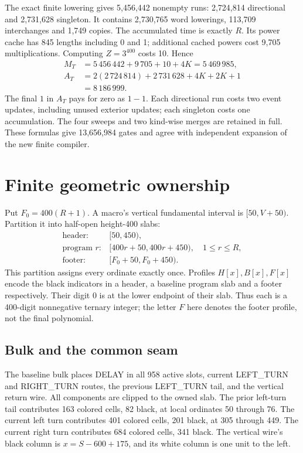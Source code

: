 \documentclass[11pt,letterpaper]{article}
\theoremstyle{definition}\newtheorem{definition}[theorem]{Definition}
\theoremstyle{remark}\newtheorem{remark}[theorem]{Remark}
\begin{document}
The exact finite lowering gives 5,456,442 nonempty runs: 2,724,814 directional and 2,731,628 singleton. It contains 2,730,765 word lowerings, 113,709 interchanges and 1,749 copies. The accumulated time is exactly $R$. Its power cache has 845 lengths including 0 and 1; additional cached powers cost 9,705 multiplications. Computing $Z=3^{400}$ costs 10. Hence
\begin{align*}
 M_T&=5\,456\,442+9\,705+10+4K=5\,469\,985,\\
 A_T&=2(2\,724\,814)+2\,731\,628+4K+2K+1\\
    &=8\,186\,999.
\end{align*}
The final $1$ in $A_T$ pays for zero as $1-1$. Each directional run costs two event updates, including unused exterior updates; each singleton costs one accumulation. The four sweeps and two kind-wise merges are retained in full. These formulas give 13,656,984 gates and agree with independent expansion of the new finite compiler.

\section{Finite geometric ownership}\label{ptr:sc:sec:geometry}
Put $F_0=400(R+1)$. A macro's vertical fundamental interval is $[50,V+50)$. Partition it into half-open height-400 slabs:
\begin{align*}
 \text{header: } &[50,450),\\
 \text{program }r: &[400r+50,400r+450),\quad 1\le r\le R,\\
 \text{footer: } &[F_0+50,F_0+450).
\end{align*}
This partition assigns every ordinate exactly once. Profiles $H[x],B[x],F[x]$ encode the black indicators in a header, a baseline program slab and a footer respectively. Their digit 0 is at the lower endpoint of their slab. Thus each is a 400-digit nonnegative ternary integer; the letter $F$ here denotes the footer profile, not the final polynomial.

\subsection{Bulk and the common seam}
The baseline bulk places DELAY in all 958 active slots, current LEFT\_TURN and RIGHT\_TURN routes, the previous LEFT\_TURN tail, and the vertical return wire. All components are clipped to the owned slab. The prior left-turn tail contributes 163 colored cells, 82 black, at local ordinates 50 through 76. The current left turn contributes 401 colored cells, 201 black, at 305 through 449. The current right turn contributes 684 colored cells, 341 black. The vertical wire's black column is $x=S-600+175$, and its white column is one unit to the left.
\end{document}
